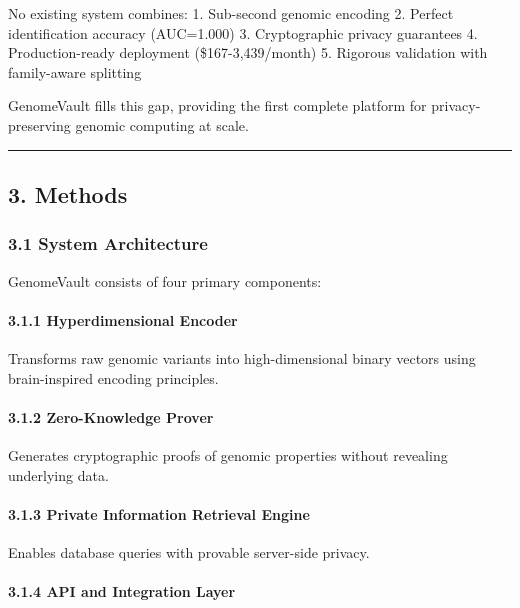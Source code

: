 \documentclass[
  11pt,
]{article}
\begin{document}
No existing system combines: 1. Sub-second genomic encoding 2. Perfect
identification accuracy (AUC=1.000) 3. Cryptographic privacy guarantees
4. Production-ready deployment (\$167-3,439/month) 5. Rigorous
validation with family-aware splitting

GenomeVault fills this gap, providing the first complete platform for
privacy-preserving genomic computing at scale.

\begin{center}\rule{0.5\linewidth}{0.5pt}\end{center}

\subsection{3. Methods}\label{methods}

\subsubsection{3.1 System Architecture}\label{system-architecture}

GenomeVault consists of four primary components:

\paragraph{3.1.1 Hyperdimensional
Encoder}\label{hyperdimensional-encoder}

Transforms raw genomic variants into high-dimensional binary vectors
using brain-inspired encoding principles.

\paragraph{3.1.2 Zero-Knowledge Prover}\label{zero-knowledge-prover}

Generates cryptographic proofs of genomic properties without revealing
underlying data.

\paragraph{3.1.3 Private Information Retrieval
Engine}\label{private-information-retrieval-engine}

Enables database queries with provable server-side privacy.

\paragraph{3.1.4 API and Integration
Layer}\label{api-and-integration-layer}
\end{document}
